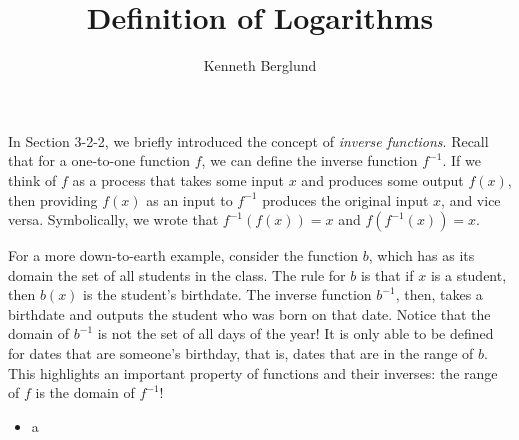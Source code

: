 \documentclass[nooutcomes]{ximera}
\author{Kenneth Berglund}
\title{Definition of Logarithms}
\begin{document}
\begin{abstract}
  
\end{abstract}
\maketitle





In Section 3-2-2, we briefly introduced the concept of \emph{inverse functions}. Recall that for a one-to-one function $f$, we can define the inverse function $f^{-1}$. If we think of $f$ as a process that takes some input $x$ and produces some output $f(x)$, then providing $f(x)$ as an input to $f^{-1}$ produces the original input $x$, and vice versa. Symbolically, we wrote that $f^{-1}(f(x)) = x$ and $f(f^{-1}(x)) = x$. 

For a more down-to-earth example, consider the function $b$, which has as its domain the set of all students in the class. The rule for $b$ is that if $x$ is a student, then $b(x)$ is the student's birthdate. The inverse function $b^{-1}$, then, takes a birthdate and outputs the student who was born on that date. Notice that the domain of $b^{-1}$ is not the set of all days of the year! It is only able to be defined for dates that are someone's birthday, that is, dates that are in the range of $b$. This highlights an important property of functions and their inverses: the range of $f$ is the domain of $f^{-1}$!



\begin{summary}\begin{itemize}
\item a
\end{itemize}\end{summary}
\end{document}
